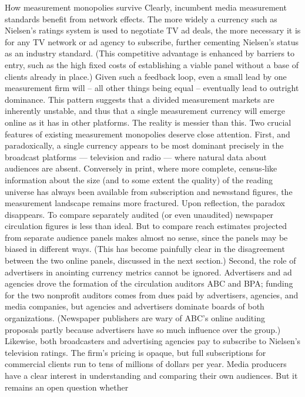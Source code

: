 How measurement monopolies survive
Clearly, incumbent media measurement standards benefit from network
effects. The more widely a currency such as Nielsen’s ratings system is
used to negotiate TV ad deals, the more necessary it is for any TV network
or ad agency to subscribe, further cementing Nielsen’s status as an
industry standard. (This competitive advantage is enhanced by barriers to
entry, such as the high fixed costs of establishing a viable panel without a
base of clients already in place.) Given such a feedback loop, even a small
lead by one measurement firm will – all other things being equal –
eventually lead to outright dominance. This pattern suggests that a
divided measurement markets are inherently unstable, and thus that a
single measurement currency will emerge online as it has in other
platforms.
The reality is messier than this. Two crucial features of existing
measurement monopolies deserve close attention. First, and
paradoxically, a single currency appears to be most dominant precisely in
the broadcast platforms — television and radio — where natural data
about audiences are absent. Conversely in print, where more complete,
census‐like information about the size (and to some extent the quality) of
the reading universe has always been available from subscription and
newsstand figures, the measurement landscape remains more fractured.
Upon reflection, the paradox disappears. To compare separately audited
(or even unaudited) newspaper circulation figures is less than ideal. But to
compare reach estimates projected from separate audience panels makes
almost no sense, since the panels may be biased in different ways. (This
has become painfully clear in the disagreement between the two online
panels, discussed in the next section.)
Second, the role of advertisers in anointing currency metrics cannot be
ignored. Advertisers and ad agencies drove the formation of the
circulation auditors ABC and BPA; funding for the two nonprofit auditors
comes from dues paid by advertisers, agencies, and media companies, but
agencies and advertisers dominate boards of both organizations.
(Newspaper publishers are wary of ABC’s online auditing proposals
partly because advertisers have so much influence over the group.)
Likewise, both broadcasters and advertising agencies pay to subscribe to
Nielsen’s television ratings. The firm’s pricing is opaque, but full
subscriptions for commercial clients run to tens of millions of dollars per
year. Media producers have a clear interest in understanding and
comparing their own audiences. But it remains an open question whether
